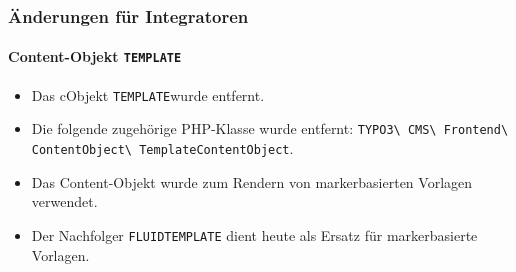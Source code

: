 %

\begin{frame}[fragile]
	\frametitle{Änderungen für Integratoren}
	\framesubtitle{Content-Objekt \small\texttt{TEMPLATE}\normalsize}


	\begin{itemize}
		\item Das cObjekt \small\texttt{TEMPLATE}\normalsize wurde entfernt.
		\item Die folgende zugehörige PHP-Klasse wurde entfernt:\newline
			\smaller\texttt{TYPO3\textbackslash
				CMS\textbackslash
				Frontend\textbackslash
				ContentObject\textbackslash
				TemplateContentObject}.\normalsize
		\item Das Content-Objekt wurde zum Rendern von markerbasierten Vorlagen verwendet.
		\item Der Nachfolger
			\small\texttt{FLUIDTEMPLATE}\normalsize
			\tabto{4.8cm} dient heute als Ersatz für markerbasierte Vorlagen.
	\end{itemize}
\end{frame}

